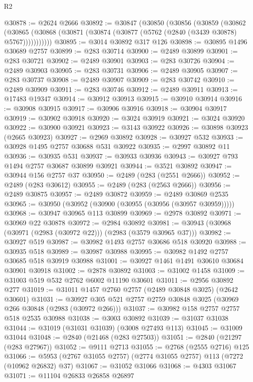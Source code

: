 \begin{lexlean}{R2}
\begin{coremodule}
@30878 := @2624 @2666
@30892 := @30847
    (@30850
      (@30856
        (@30859
          (@30862
            (@30865 (@30868 (@30871 (@30874 (@30877 (@5762 (@2840 (@3439 @30878) @5767)))))))))))
@30895 := @3014 @30892 @317 @126
@30898 := @30895 @1496 @30689 @2757
@30899 := @283 @30714
@30900 := @2489 @30899
@30901 := @283 @30721
@30902 := @2489 @30901
@30903 := @283 @30726
@30904 := @2489 @30903
@30905 := @283 @30731
@30906 := @2489 @30905
@30907 := @283 @30737
@30908 := @2489 @30907
@30909 := @283 @30742
@30910 := @2489 @30909
@30911 := @283 @30746
@30912 := @2489 @30911
@30913 := @17483 @19347
@30914 := @30912 @30913
@30915 := @30910 @30914
@30916 := @30908 @30915
@30917 := @30906 @30916
@30918 := @30904 @30917
@30919 := @30902 @30918
@30920 := @3024 @30919
@30921 := @3024 @30920
@30922 := @30900 @30921
@30923 := @3143 @30922
@30926 := @30898 @30923 (@2665 @30923)
@30927 := @2969 @30892
@30928 := @30927 @532
@30933 := @30928 @1495 @2757 @30688 @531 @30922
@30935 := @2997 @30892 @11
@30936 := @30935 @531
@30937 := @30933 @30936
@30943 := @30927 @793 @1494 @2757 @30687 @30899 @30921
@30944 := @3521 @30892
@30947 := @30944 @156 @2757 @37
@30950 := @2489 (@283 (@2551 @2666))
@30952 := @2489 (@283 @30612)
@30955 := @2489 (@283 (@2563 @2666))
@30956 := @2489 @30875
@30957 := @2489 @30872
@30959 := @2489 @30869 @2535
@30965 := @30950 (@30952 (@30900 (@30955 (@30956 (@30957 @30959)))))
@30968 := @30947 @30965 @113 @30899
@30969 := @2978 @30892
@30971 := @30969 @22 @30878
@30972 := @2984 @30892
@30981 := @30943 (@30968 (@30971 (@2983 (@30972 @22))) (@2983 (@3579 @30965 @37)))
@30982 := @30927 @519
@30987 := @30982 @1493 @2757 @30686 @518 @30920
@30988 := @30935 @518
@30989 := @30987 @30988
@30995 := @30982 @1492 @2757 @30685 @518 @30919 @30988
@31001 := @30927 @1461 @1491 @30610 @30684 @30901 @30918
@31002 := @2878 @30892
@31003 := @31002 @1458
@31009 := @31003 @519 @532 @2762 @6002 @11190 @30601
@31011 := @2956 @30892 @277
@31019 := @31011 @1457 @2760 @2757 (@2489 @30848 @3025) (@2642 @30601)
@31031 := @30927 @305 @521 @2757 @2759 @30848 @3025 (@30969 @266 @30848 (@2983 (@30972 @266)))
@31037 := @30982 @158 @2757 @2757 @518 @2535 @30988
@31038 := @3003 @30892
@31039 := @31037 @31038
@31044 := @31019 (@31031 @31039) (@3008 @27493 @113)
@31045 := @31009 @31044
@31048 := @2840 (@21468 (@283 @27503))
@31051 := @2840 (@21297 (@283 @27967))
@31052 := @9111 @2713
@31055 := @2768 (@2555 @2716) @125
@31066 := @5953 (@2767 @31055 @2757) (@2774 @31055 @2757) @113 (@7272 (@10962 @26832) @37)
@31067 := @31052 @31066
@31068 := @4303 @31067
@31071 := @11104 @26833 @26858 @26897

\end{coremodule}
\end{lexlean}
